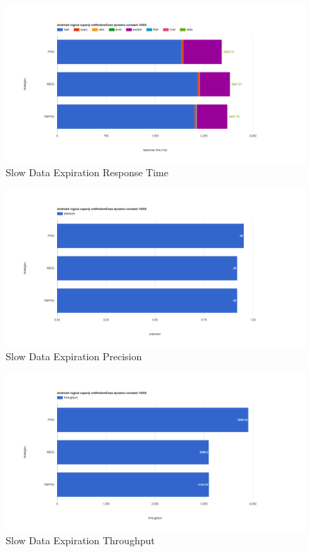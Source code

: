\begin{figure}[!htbp]
	\centering
    \includegraphics[width=6.5in]{img/app3-ets-slow-r.png}
    \caption{Slow Data Expiration Response Time}
\end{figure}
\begin{figure}[!htbp]
	\centering
    \includegraphics[width=6.5in]{img/app3-ets-slow-p.png}
    \caption{Slow Data Expiration Precision}
\end{figure}
\begin{figure}[!htbp]
	\centering
    \includegraphics[width=6.5in]{img/app3-ets-slow-t.png}
    \caption{Slow Data Expiration Throughput}
\end{figure}
